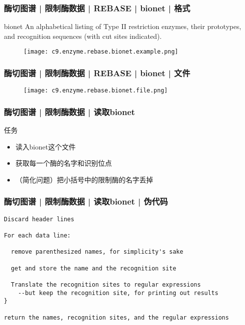 \begin{frame}
  \frametitle{酶切图谱 | 限制酶数据 | REBASE | bionet | 格式}
  \begin{block}{bionet}
    An alphabetical listing of Type II restriction enzymes, their prototypes, and recognition sequences (with cut sites indicated). 
  \end{block}
  \begin{figure}
    \centering
    \texttt{[image: c9.enzyme.rebase.bionet.example.png]}
  \end{figure}
\end{frame}

\begin{frame}
  \frametitle{酶切图谱 | 限制酶数据 | REBASE | bionet | 文件}
  \begin{figure}
    \centering
    \texttt{[image: c9.enzyme.rebase.bionet.file.png]}
  \end{figure}
\end{frame}

\begin{frame}
  \frametitle{酶切图谱 | 限制酶数据 | 读取bionet}
  \begin{block}{任务}
    \begin{itemize}
      \item 读入bionet这个文件
      \item 获取每一个酶的名字和识别位点
      \item （简化问题）把小括号中的限制酶的名字丢掉
    \end{itemize}
  \end{block}
\end{frame}

\begin{frame}[fragile]
  \frametitle{酶切图谱 | 限制酶数据 | 读取bionet | 伪代码}
\begin{lstlisting}[basicstyle=\small\tt]
Discard header lines 

For each data line:

  remove parenthesized names, for simplicity's sake

  get and store the name and the recognition site

  Translate the recognition sites to regular expressions
    --but keep the recognition site, for printing out results
}

return the names, recognition sites, and the regular expressions
\end{lstlisting}
\end{frame}

